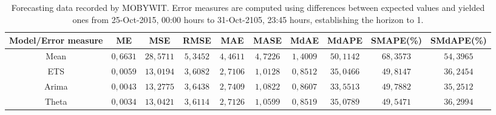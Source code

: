 \begin{table}
{\scriptsize
\centering
\begin{tabular}{|c|c|c|c|c|c|c|c|c|c|}
\hline
Model/Error measure & ME &MSE &RMSE &MAE &MASE &MdAE &MdAPE & SMAPE(\%) & SMdAPE(\%) \\
\hline
Mean & $0,6631$ & $28,5711$ & $5,3452$ & $4,4611$ & $4,7226$ & $1,4009$ & $50,1142$ & $68,3573$ & $54,3965$ \\
ETS & $0,0059$ & \bf{$13,0194$} & \bf{$3,6082$} & \bf{$2,7106$} & \bf{$1,0128$} & \bf{$0,8512$} & $35,0466$ & $49,8147$ & $36,2454$ \\
Arima & $0,0043$ & $13,2775$ & $3,6438$ & $2,7409$ & $1,0822$ & $0,8607$ & \bf{$33,5513$} & $49,7882$ & \bf{$35,2512$}  \\
Theta & \bf{$0,0034$} & $13,0421$ & $3,6114$ & $2,7126$ & $1,0599$ & $0,8519$ & $35,0789$ & \bf{$49,5471$} & $36,2994$  \\
\hline
\end{tabular}
}
\caption{Forecasting data recorded by MOBYWIT. Error measures are computed using differences between expected values and yielded ones from 25-Oct-2015, 00:00 hours to 31-Oct-2105, 23:45 hours, establishing the horizon to 1.}
\label{tab:forecasting}
\end{table}
